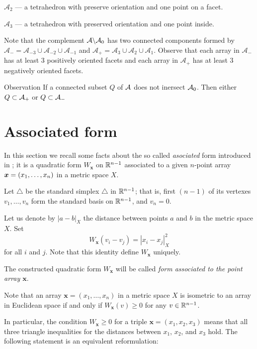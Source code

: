 \documentclass{article}
\begin{document}
$\mathcal{A}_{2}$ --- a tetrahedron with preserve orientation and one point on a facet.

$\mathcal{A}_{3}$ --- a tetrahedron with preserved orientation and one point inside.

Note that the complement $\mathcal{A}\backslash \mathcal{A}_0$ has two connected components formed by $\mathcal{A}_{-}=\mathcal{A}_{-3}\cup \mathcal{A}_{-2}\cup\mathcal{A}_{-1}$ and $\mathcal{A}_{+}=\mathcal{A}_{3}\cup \mathcal{A}_{2}\cup\mathcal{A}_{1}$.
Observe that each array in $\mathcal{A}_{-}$ has at least 3 positively oriented facets and each array in $\mathcal{A}_{+}$ has at least 3 negatively oriented facets.

\begin{thm}{Observation}\label{obs:connectedA}
If a connected subset $Q$ of $\mathcal{A}$ does not inersect $\mathcal{A}_0$.
Then either $Q\subset \mathcal{A}_+$ or $Q\subset \mathcal{A}_-$
\end{thm}


\section{Associated form}

In this section we recall some facts about the so called \emph{asociated} form introduced in \cite{petrunin-2017};
it is a quadratic form 
$W_{\bm{x}}$ on $\mathbb{R}^{n-1}$ associated
to a given $n$-point array $\bm{x}\z=(x_1,\dots,x_n)$ in a metric space $X$.

Let $\triangle$ be the standard simplex $\triangle$ in $\mathbb{R}^{n-1}$; that is, first $(n-1)$ of its vertexes $v_1,\dots,v_n$ form the standard basis on $\mathbb{R}^{n-1}$,
 and $v_n=0$.

Let us denote by $|a-b|_X$ the distance between points $a$ and $b$ in the metric space $X$.
Set
\[W_{\bm{x}}(v_i-v_j)=|x_i-x_j|^2_X\] 
for all $i$ and $j$.
Note that this identity define $W_{\bm{x}}$ uniquely.


The constructed quadratic form $W_{\bm{x}}$ will be called \emph{form associated to the point array $\bm{x}$}.

Note that an array $\bm{x}=(x_1,\dots,x_n)$ in a metric space $X$ is isometric to an array in Euclidean space if and only if 
$W_{\bm{x}}(v)\ge 0$
for any $v\in \mathbb{R}^{n-1}$.

In particular,  the
condition $W_{\bm{x}}\ge 0$ for a triple $\bm{x}=(x_1,x_2,x_3)$ means that 
all three triangle inequalities for the distances between $x_1$, $x_2$, and $x_3$ hold.
The following statement is an equivalent reformulation:
\end{document}
